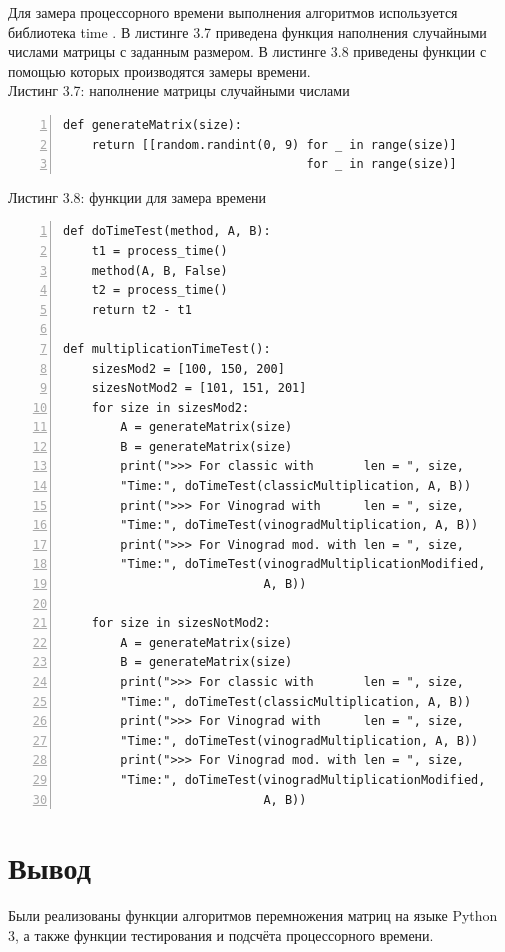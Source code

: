 \documentclass[12pt,a4paper]{report}
\begin{document}
Для замера процессорного времени выполнения алгоритмов используется библиотека time \cite{time_bib}. 
В листинге 3.7 приведена функция наполнения случайными числами матрицы с заданным размером. 
В листинге 3.8 приведены функции с помощью которых производятся замеры времени. \\

\textrm{Листинг 3.7: наполнение матрицы случайными числами}
\begin{lstlisting}[frame=single, numbers=left]
def generateMatrix(size):
    return [[random.randint(0, 9) for _ in range(size)] 
                                  for _ in range(size)]
\end{lstlisting}
\newpage
\textrm{Листинг 3.8: функции для замера времени}
\begin{lstlisting}[frame=single, numbers=left]
def doTimeTest(method, A, B):
    t1 = process_time()
    method(A, B, False)
    t2 = process_time()
    return t2 - t1

def multiplicationTimeTest():
    sizesMod2 = [100, 150, 200]
    sizesNotMod2 = [101, 151, 201]
    for size in sizesMod2:
        A = generateMatrix(size)
        B = generateMatrix(size)
        print(">>> For classic with       len = ", size, 
        "Time:", doTimeTest(classicMultiplication, A, B))
        print(">>> For Vinograd with      len = ", size, 
        "Time:", doTimeTest(vinogradMultiplication, A, B))
        print(">>> For Vinograd mod. with len = ", size, 
        "Time:", doTimeTest(vinogradMultiplicationModified, 
                            A, B))

    for size in sizesNotMod2:
        A = generateMatrix(size)
        B = generateMatrix(size)
        print(">>> For classic with       len = ", size, 
        "Time:", doTimeTest(classicMultiplication, A, B))
        print(">>> For Vinograd with      len = ", size, 
        "Time:", doTimeTest(vinogradMultiplication, A, B))
        print(">>> For Vinograd mod. with len = ", size, 
        "Time:", doTimeTest(vinogradMultiplicationModified, 
                            A, B))
\end{lstlisting}

\section{Вывод}

Были реализованы функции алгоритмов перемножения матриц на языке Python 3, а также функции тестирования 
и подсчёта процессорного времени. 
\end{document}
